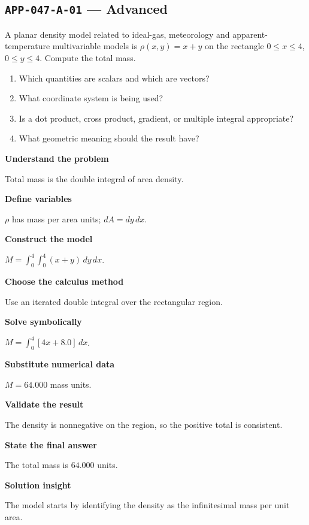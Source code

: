 \documentclass[11pt]{book}
\newcommand{\pid}[1]{\texttt{#1}}
\begin{document}
\subsection*{\pid{APP-047-A-01} — Advanced}
\begin{problembox}
A planar density model related to ideal-gas, meteorology and apparent-temperature multivariable models is $\rho(x,y)=x+y$ on the rectangle $0\le x\le 4$, $0\le y\le 4$. Compute the total mass.
\end{problembox}
\begin{promptbox}\begin{enumerate}
\item Which quantities are scalars and which are vectors?
\item What coordinate system is being used?
\item Is a dot product, cross product, gradient, or multiple integral appropriate?
\item What geometric meaning should the result have?
\end{enumerate}\end{promptbox}
\begin{solutionbox}
\textbf{Understand the problem}\par Total mass is the double integral of area density.\par\medskip
\textbf{Define variables}\par $\rho$ has mass per area units; $dA=dy\,dx$.\par\medskip
\textbf{Construct the model}\par $M=\int_0^{4}\int_0^{4}(x+y)\,dy\,dx$.\par\medskip
\textbf{Choose the calculus method}\par Use an iterated double integral over the rectangular region.\par\medskip
\textbf{Solve symbolically}\par $M=\int_0^{4}[4x+8.0]\,dx$.\par\medskip
\textbf{Substitute numerical data}\par $M=64.000$ mass units.\par\medskip
\textbf{Validate the result}\par The density is nonnegative on the region, so the positive total is consistent.\par\medskip
\textbf{State the final answer}\par The total mass is $64.000$ units.\par\medskip
\textbf{Solution insight}\par The model starts by identifying the density as the infinitesimal mass per unit area.\par\medskip
\end{solutionbox}
\end{document}
